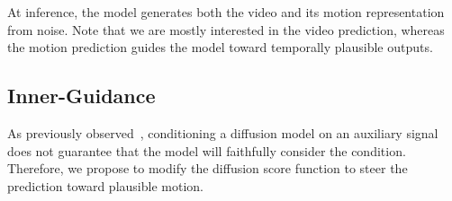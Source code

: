 At inference, the model generates both the video and its motion representation from noise. Note that we are mostly interested in the video prediction, whereas the motion prediction guides the model toward temporally plausible outputs.

\vspace{-0.2cm}
\subsection{Inner-Guidance}
\label{sec:inner_guidance}
As previously observed~\cite{ho2022classifier}, conditioning a diffusion model on an auxiliary signal does not guarantee that the model will faithfully consider the condition. 
Therefore, we propose to modify the diffusion score function to steer the prediction toward plausible motion.  

